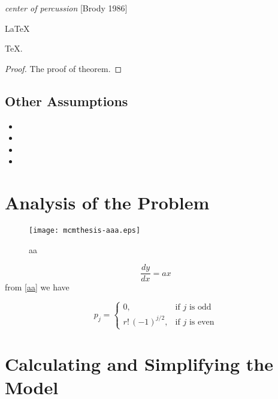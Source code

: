 \documentclass{mcmthesis}
\begin{document}
\emph{center of percussion} [Brody 1986]

\begin{Theorem} \label{thm:latex}
\LaTeX
\end{Theorem}
\begin{Lemma} \label{thm:tex}
\TeX .
\end{Lemma}
\begin{proof}
The proof of theorem.
\end{proof}

\subsection{Other Assumptions}%

\begin{itemize}
\item
\item
\item
\item
\end{itemize}



\section{Analysis of the Problem}%
\begin{figure}[h]
\small
\centering
\texttt{[image: mcmthesis-aaa.eps]}
\caption{aa} \label{fig:aa}
\end{figure}


\begin{equation}
\frac{dy}{dx}=ax \label{aa}
\end{equation}
from \eqref{aa} we have

\[
  p_{j}=\begin{cases} 0,&\text{if $j$ is odd}\\
  r!\,(-1)^{j/2},&\text{if $j$ is even}
  \end{cases}
\]


\section{Calculating and Simplifying the Model}%
\end{document}
